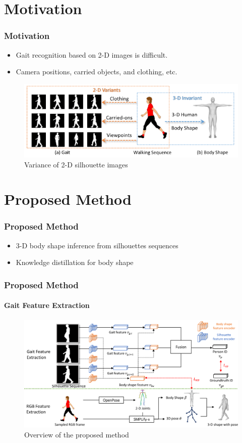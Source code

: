 \documentclass[
	11pt, %
	aspectratio=169, %
]{beamer}
\begin{document}
\section{Motivation}

\begin{frame}
	\frametitle{Motivation}

	\begin{itemize}
		\item Gait recognition based on 2-D images is difficult.
		\item Camera positions, carried objects, and clothing, etc.
	\end{itemize}

	\begin{figure}
		\centering
		\includegraphics[width=0.7\linewidth]{"./Images/motivation.png"}
		\caption{Variance of 2-D silhouette images}
	\end{figure}
\end{frame}


\section{Proposed Method}

\begin{frame}
	\frametitle{Proposed Method}

	\begin{itemize}
		\item 3-D body shape inference from silhouettes sequences
		\item Knowledge distillation for body shape
	\end{itemize}

\end{frame}

\begin{frame}
	\frametitle{Proposed Method}
	\framesubtitle{Gait Feature Extraction}

	\begin{figure}
		\centering
		\includegraphics[width=0.8\linewidth]{"./Images/overview.png"}
		\caption{Overview of the proposed method}
	\end{figure}
\end{frame}
\end{document}

